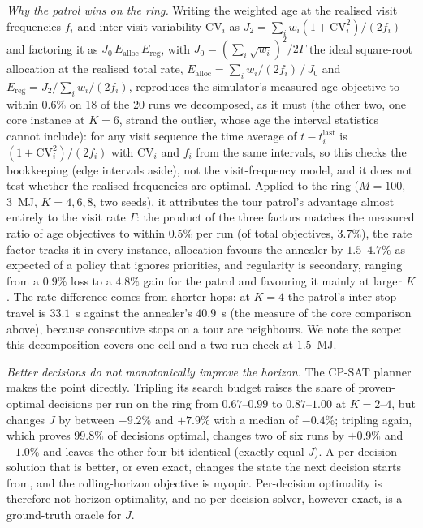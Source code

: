 \documentclass[journal,outdir=./]{IEEEtran}
\newcommand{\Gam}{\Gamma}
\begin{document}
\textit{Why the patrol wins on the ring.} Writing the weighted age at the realised visit frequencies $f_i$ and inter-visit variability $\mathrm{CV}_i$ as $J_2=\sum_i w_i(1+\mathrm{CV}_i^2)/(2f_i)$ and factoring it as $J_0\,E_{\mathrm{alloc}}\,E_{\mathrm{reg}}$, with $J_0=(\sum_i\sqrt{w_i})^2/2\Gam$ the ideal square-root allocation at the realised total rate, $E_{\mathrm{alloc}}=\sum_i w_i/(2f_i)\,/\,J_0$ and $E_{\mathrm{reg}}=J_2/\sum_i w_i/(2f_i)$, reproduces the simulator's measured age objective to within $0.6\%$ on 18 of the 20 runs we decomposed, as it must (the other two, one core instance at $K=6$, strand the outlier, whose age the interval statistics cannot include): for any visit sequence the time average of $t-t^{\mathrm{last}}_i$ is $(1+\mathrm{CV}_i^2)/(2f_i)$ with $\mathrm{CV}_i$ and $f_i$ from the same intervals, so this checks the bookkeeping (edge intervals aside), not the visit-frequency model, and it does not test whether the realised frequencies are optimal. Applied to the ring ($M=100$, 3~MJ, $K=4,6,8$, two seeds), it attributes the tour patrol's advantage almost entirely to the visit rate $\Gam$: the product of the three factors matches the measured ratio of age objectives to within $0.5\%$ per run (of total objectives, $3.7\%$), the rate factor tracks it in every instance, allocation favours the annealer by $1.5$--$4.7\%$ as expected of a policy that ignores priorities, and regularity is secondary, ranging from a $0.9\%$ loss to a $4.8\%$ gain for the patrol and favouring it mainly at larger $K$. The rate difference comes from shorter hops: at $K=4$ the patrol's inter-stop travel is $33.1$~s against the annealer's $40.9$~s (the measure of the core comparison above), because consecutive stops on a tour are neighbours. We note the scope: this decomposition covers one cell and a two-run check at 1.5~MJ.

\textit{Better decisions do not monotonically improve the horizon.} The CP-SAT planner makes the point directly. Tripling its search budget raises the share of proven-optimal decisions per run on the ring from $0.67$--$0.99$ to $0.87$--$1.00$ at $K=2$--$4$, but changes $J$ by between $-9.2\%$ and $+7.9\%$ with a median of $-0.4\%$; tripling again, which proves $99.8\%$ of decisions optimal, changes two of six runs by $+0.9\%$ and $-1.0\%$ and leaves the other four bit-identical (exactly equal $J$). A per-decision solution that is better, or even exact, changes the state the next decision starts from, and the rolling-horizon objective is myopic. Per-decision optimality is therefore not horizon optimality, and no per-decision solver, however exact, is a ground-truth oracle for $J$.
\end{document}
